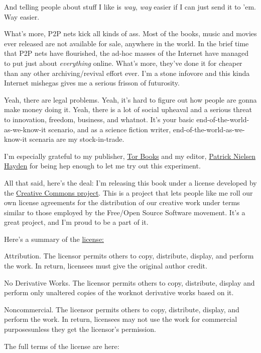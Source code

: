 And telling people about stuff I like is \emph{way}, \emph{way}
easier if I can just send it to 'em. Way easier.

What's more, P2P nets kick all kinds of ass. Most of the books,
music and movies ever released are not available for sale, anywhere
in the world. In the brief time that P2P nets have flourished, the
ad-hoc masses of the Internet have managed to put just about
\emph{everything} online. What's more, they've done it for cheaper
than any other archiving/revival effort ever. I'm a stone infovore
and this kinda Internet mishegas gives me a serious frisson of
futurosity.

Yeah, there are legal problems. Yeah, it's hard to figure out how
people are gonna make money doing it. Yeah, there is a lot of
social upheaval and a serious threat to innovation, freedom,
business, and whatnot. It's your basic
end-of-the-world-as-we-know-it scenario, and as a science fiction
writer, end-of-the-world-as-we-know-it scenaria are my
stock-in-trade.

I'm especially grateful to my publisher,
\href{http://www.tor.com/}{Tor Books} and my editor,
\href{http://nielsenhayden.com/electrolite}{Patrick Nielsen Hayden}
for being hep enough to let me try out this experiment.

All that said, here's the deal: I'm releasing this book under a
license developed by the 
\href{http://creativecommons.org/}{Creative Commons project}.
This is a project that lets people like me roll our own license
agreements for the distribution of our creative work under terms
similar to those employed by the Free/Open Source Software
movement. It's a great project, and I'm proud to be a part of it.

Here's a summary of the 
\href{http://creativecommons.org/licenses/by-nd-nc/1.0}{license:}

Attribution. The licensor permits others to copy, distribute,
display, and perform the work. In return, licensees must give the
original author credit.

No Derivative Works. The licensor permits others to copy,
distribute, display and perform only unaltered copies of the
work{\dash}not derivative works based on it.

Noncommercial. The licensor permits others to copy, distribute,
display, and perform the work. In return, licensees may not use the
work for commercial purposes{\dash}unless they get the licensor's
permission.

The full terms of the license are here:

